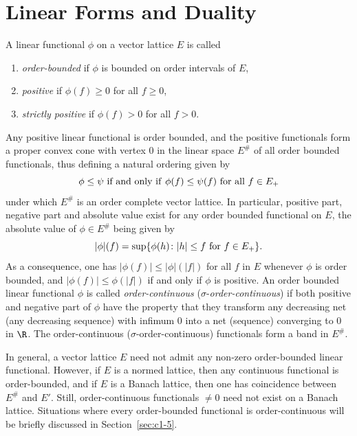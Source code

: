 \section{Linear Forms and Duality}\label{sec:c1-3}%
A linear functional $ \phi $ on a vector lattice $ E $ is called
\begin{enumerate}[\upshape (i)]

\item
\emph{order-bounded} if\/ $ \phi $ is bounded on order intervals of\/ $ E $,

\item
\emph{positive} if\/ $ \phi(f) \geq 0 $ for all  $ f \geq 0 $, 

\item
\emph{strictly positive} if\/ $ \phi(f) > 0 $ for all  $ f > 0 $.

\end{enumerate}
Any positive linear functional is order bounded, and the positive functionals form a proper convex cone with vertex $ 0 $ in the linear space $ E^{\#} $ of all order bounded functionals, thus defining a natural
ordering given by 
%
\[
	\text{$ \phi \leq \psi $ if and only if\/ $ \phi(f) \leq \psi(f) $ for all $ f \in E_{+} $}
\]
%
under which $ E^{\#} $ is an order complete vector lattice.
In particular, positive part, negative part and absolute value exist for any order bounded functional on $ E $, the absolute value of\/ $ \phi \in E^{\#} $ being given by
\[
	|\phi|(f) = \sup\{\phi(h) \colon |h| \leq f \text{ for $ f \in E_{+} $}\}.
\]
As a consequence, one has $ |\phi(f)| \leq |\phi|(|f|) $ for all $ f $ in $ E $ whenever $ \phi $ is order bounded, and $ |\phi(f)| \leq \phi(|f|) $ if and only if\/ $ \phi $ is positive.
An order bounded linear functional $ \phi $ is called \emph{order-continuous} ($ \sigma $-\emph{order-continuous}) if both positive and negative part of\/ $ \phi $ have the property that they transform any decreasing net (any decreasing sequence) with infimum $ 0 $ into a net (sequence) converging to $ 0 $ in $ \R $.
The order-continuous ($ \sigma $-order-continuous) functionals form a band in $ E^{\#} $.

In general, a vector lattice $ E $ need not admit any non-zero order-bounded linear functional.
However, if\/ $ E $ is a normed lattice, then any continuous functional is order-bounded, and if\/ $ E $ is a Banach lattice, then one has coincidence between $ E^{\#} $ and $ E' $.
Still, order-continuous functionals $ \neq 0 $ need not exist on a Banach lattice.
Situations where every order-bounded functional is order-continuous will be briefly discussed in Section~\ref{sec:c1-5}.

